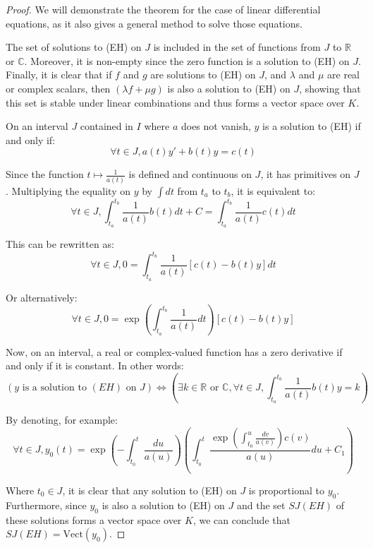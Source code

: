 \documentclass[french,12pt,a4paper]{book}
\numberwithin{equation}{chapter}
\begin{document}
\begin{proof}
We will demonstrate the theorem for the case of linear differential equations, as it also gives a general method to solve those equations.

The set of solutions to (EH) on \( J \) is included in the set of functions from \( J \) to \( \mathbb{R} \) or \( \mathbb{C} \). Moreover, it is non-empty since the zero function is a solution to (EH) on \( J \). Finally, it is clear that if \( f \) and \( g \) are solutions to (EH) on \( J \), and \( \lambda \) and \( \mu \) are real or complex scalars, then \( (\lambda f + \mu g) \) is also a solution to (EH) on \( J \), showing that this set is stable under linear combinations and thus forms a vector space over \( K \).

On an interval \( J \) contained in \( I \) where \( a \) does not vanish, \( y \) is a solution to (EH) if and only if:
\[ \forall t \in J, a(t)y' + b(t)y = c(t) \]

Since the function \( t \mapsto \frac{1}{a(t)} \) is defined and continuous on \( J \), it has primitives on \( J \). Multiplying the equality on \( y \) by \( \int dt \) from \( t_a \) to \( t_b \), it is equivalent to:
\[ \forall t \in J, \int_{t_a}^{t_b} \frac{1}{a(t)}b(t) dt + C = \int_{t_a}^{t_b} \frac{1}{a(t)}c(t) dt \]

This can be rewritten as:
\[ \forall t \in J, 0 = \int_{t_a}^{t_b} \frac{1}{a(t)}[c(t) - b(t)y] dt \]

Or alternatively:
\[ \forall t \in J, 0 = \exp\left(\int_{t_a}^{t_b} \frac{1}{a(t)}dt\right)[c(t) - b(t)y] \]

Now, on an interval, a real or complex-valued function has a zero derivative if and only if it is constant. In other words:
\[ (y \text{ is a solution to } (EH) \text{ on } J) \Leftrightarrow (\exists k \in \mathbb{R} \text{ or } \mathbb{C}, \forall t \in J, \int_{t_a}^{t_b} \frac{1}{a(t)}b(t)y = k) \]

By denoting, for example:
\[ \forall t \in J, y_0(t) = \exp\left(-\int_{t_0}^{t} \frac{du}{a(u)}\right)\left(\int_{t_0}^{t} \frac{\exp\left(\int_{t_0}^{u} \frac{dv}{a(v)}\right)c(v)}{a(u)} du + C_1\right) \]

Where \( t_0 \in J \), it is clear that any solution to (EH) on \( J \) is proportional to \( y_0 \). Furthermore, since \( y_0 \) is also a solution to (EH) on \( J \) and the set \( SJ(EH) \) of these solutions forms a vector space over \( K \), we can conclude that \( SJ(EH) = \text{Vect}(y_0) \).


\end{proof}
\end{document}
